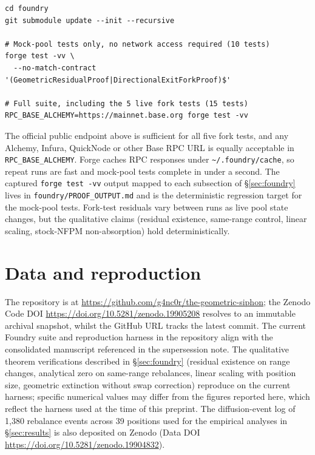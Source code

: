 \documentclass[11pt,a4paper]{article}
\newenvironment{codeblock}{%
  \begin{mdframed}[%
    backgroundcolor=brown!3!white,%
    linewidth=0pt,%
    innertopmargin=6pt,%
    innerbottommargin=6pt,%
    innerleftmargin=12pt,%
    innerrightmargin=12pt,%
    leftmargin=0.075\linewidth,%
    rightmargin=0.075\linewidth,%
    skipabove=6pt,%
    skipbelow=6pt%
  ]\footnotesize%
}{%
  \end{mdframed}%
}
\begin{document}
\begin{codeblock}\begin{verbatim}
cd foundry
git submodule update --init --recursive

# Mock-pool tests only, no network access required (10 tests)
forge test -vv \
  --no-match-contract '(GeometricResidualProof|DirectionalExitForkProof)$'

# Full suite, including the 5 live fork tests (15 tests)
RPC_BASE_ALCHEMY=https://mainnet.base.org forge test -vv
\end{verbatim}\end{codeblock}

The official public endpoint above is sufficient for all five fork tests, and any Alchemy, Infura, QuickNode or other Base RPC URL is equally acceptable in \texttt{RPC\_BASE\_ALCHEMY}. Forge caches RPC responses under \texttt{\textasciitilde/.foundry/cache}, so repeat runs are fast and mock-pool tests complete in under a second. The captured \texttt{forge test -vv} output mapped to each subsection of \S\ref{sec:foundry} lives in \texttt{foundry/PROOF\_OUTPUT.md} and is the deterministic regression target for the mock-pool tests. Fork-test residuals vary between runs as live pool state changes, but the qualitative claims (residual existence, same-range control, linear scaling, stock-NFPM non-absorption) hold deterministically.

\section{Data and reproduction}\label{app:reproduction}

The repository is at \url{https://github.com/g4nc0r/the-geometric-siphon}; the Zenodo Code DOI \url{https://doi.org/10.5281/zenodo.19905208} resolves to an immutable archival snapshot, whilst the GitHub URL tracks the latest commit. The current Foundry suite and reproduction harness in the repository align with the consolidated manuscript referenced in the supersession note. The qualitative theorem verifications described in \S\ref{sec:foundry} (residual existence on range changes, analytical zero on same-range rebalances, linear scaling with position size, geometric extinction without swap correction) reproduce on the current harness; specific numerical values may differ from the figures reported here, which reflect the harness used at the time of this preprint. The diffusion-event log of 1{,}380 rebalance events across 39 positions used for the empirical analyses in \S\ref{sec:results} is also deposited on Zenodo (Data DOI \url{https://doi.org/10.5281/zenodo.19904832}).
\end{document}

